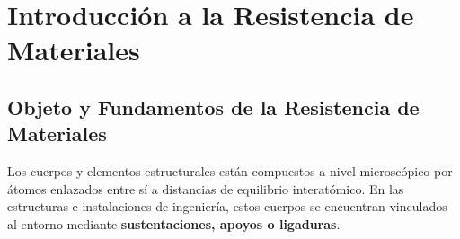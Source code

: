 \chapter{Introducción a la Resistencia de Materiales}


\section{Objeto y Fundamentos de la Resistencia de Materiales}



Los cuerpos y elementos estructurales están compuestos a nivel microscópico por átomos enlazados entre sí a distancias de equilibrio interatómico. En las estructuras e instalaciones de ingeniería, estos cuerpos se encuentran vinculados al entorno mediante \textbf{sustentaciones, apoyos o ligaduras}.




